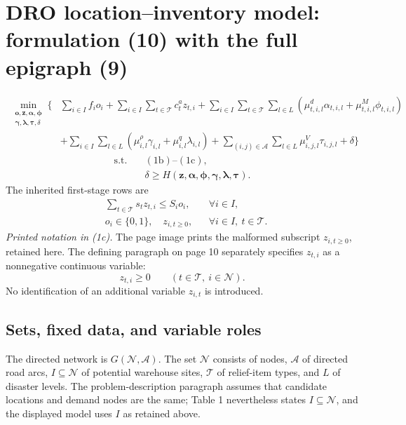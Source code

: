 \documentclass{article}
\begin{document}
\section*{DRO location--inventory model: formulation (10) with the full epigraph (9)}
\begin{equation}
\begin{aligned}
\min_{\substack{\boldsymbol{o},\boldsymbol{z},\boldsymbol{\alpha},\boldsymbol{\phi}\\
\boldsymbol{\gamma},\boldsymbol{\lambda},\boldsymbol{\tau},\delta}}
\Biggl\{&\sum_{i\in I}f_i o_i+
\sum_{i\in I}\sum_{t\in\mathcal T}c_t^a z_{t,i}
+\sum_{i\in I}\sum_{t\in\mathcal T}\sum_{l\in L}
 \left(\mu^d_{t,i,l}\alpha_{t,i,l}+\mu^M_{t,i,l}\phi_{t,i,l}\right)\\
&+\sum_{i\in I}\sum_{l\in L}
 \left(\mu^\rho_{i,l}\gamma_{i,l}+\mu^q_{i,l}\lambda_{i,l}\right)
+\sum_{(i,j)\in\mathcal A}\sum_{l\in L}\mu^V_{i,j,l}\tau_{i,j,l}+\delta\Biggr\}
\end{aligned}\tag{10a}
\end{equation}
\begin{align}
\text{s.t.}\quad &(1\mathrm b)\text{--}(1\mathrm c),\tag{10b}\\
&\delta\geq H(\boldsymbol z,\boldsymbol\alpha,\boldsymbol\phi,
\boldsymbol\gamma,\boldsymbol\lambda,\boldsymbol\tau).\tag{10c}
\end{align}
The inherited first-stage rows are
\begin{align}
&\sum_{t\in\mathcal T}s_t z_{t,i}\leq S_i o_i,
&&\forall i\in I,\tag{1b}\\
&o_i\in\{0,1\},\quad z_{i,t\geq0},
&&\forall i\in I,\ t\in\mathcal T.\tag{1c}
\end{align}
\noindent\emph{Printed notation in (1c).} The page image prints the malformed subscript
$z_{i,t\geq0}$, retained here. The defining paragraph on page 10 separately specifies
$z_{t,i}$ as a nonnegative continuous variable:
\[
z_{t,i}\geq0\qquad(t\in\mathcal T,\ i\in\mathcal N).
\]
No identification of an additional variable $z_{i,t}$ is introduced.

\subsection*{Sets, fixed data, and variable roles}
The directed network is $G(\mathcal N,\mathcal A)$. The set $\mathcal N$ consists of nodes,
$\mathcal A$ of directed road arcs, $I\subseteq\mathcal N$ of potential warehouse sites,
$\mathcal T$ of relief-item types, and $L$ of disaster levels. The problem-description
paragraph assumes that candidate locations and demand nodes are the same; Table 1
nevertheless states $I\subseteq\mathcal N$, and the displayed model uses $I$ as retained above.
\end{document}
